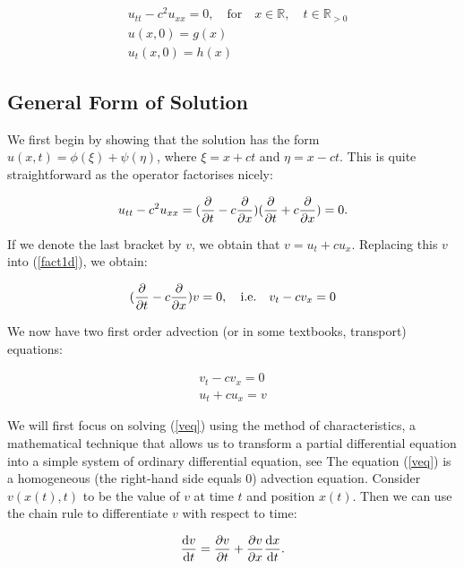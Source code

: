 \documentclass[a4paper, 12pt]{article}
\numberwithin{equation}{section}
\begin{document}
\begin{equation} \label{ivp1d}
    \begin{aligned}
    &u_{tt}-c^2u_{xx}=0, \quad \textrm{for} \quad x\in \mathbb{R},\quad t\in \mathbb{R}_{>0}\\
    &u(x,0)=g(x)\\
    &u_t(x,0)=h(x)
    \end{aligned}
\end{equation}

\subsection{General Form of Solution}

We first begin by showing that the solution has the form $u(x, t)=\phi(\xi)+\psi(\eta)$, where $\xi=x+ct$ and $\eta=x-ct$. This is quite straightforward
as the operator factorises nicely:

\begin{equation} \label{fact1d}
    u_{tt}-c^2u_{xx}=(\diffp[1]{}{t} - c \diffp[1]{}{x})(\diffp[1]{}{t} + c \diffp[1]{}{x})=0.
\end{equation}

If we denote the last bracket by $v$, we obtain that $v=u_t+cu_x$. Replacing this $v$ into (\ref{fact1d}), we obtain:

\begin{equation*} 
    (\diffp[1]{}{t} -c \diffp[1]{}{x})v=0, \quad \textrm{i.e.} \quad v_t-cv_x=0
\end{equation*}

We now have two first order advection (or in some textbooks, transport) equations:

\begin{align}
    v_t-cv_x=0 \label{veq}\\
    u_t+cu_x=v \label{ueq}
\end{align}

We will first focus on solving (\ref{veq}) using the method of characteristics, a mathematical technique that allows us to transform a partial differential
equation into a simple system of ordinary differential equation, see \cite{Ev} The equation (\ref{veq}) is a homogeneous (the right-hand side equals $0$) 
advection equation. Consider $v(x(t),t)$ to be the value of $v$ at time $t$ and position $x(t)$. Then we can use the chain rule to differentiate
$v$ with respect to time:

\begin{equation} \label{diffv}
    \diff{v}{t}=\diffp[1]{v}{t}+\diffp[1]{v}{x}\diff{x}{t}.
\end{equation}
\end{document}
